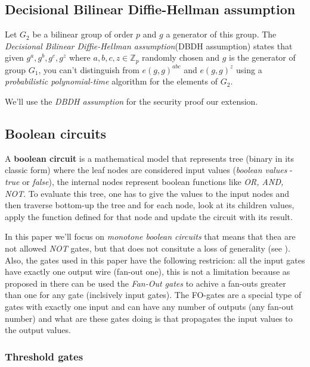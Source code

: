 \documentclass[12pt]{article}
\begin{document}
\subsection{Decisional Bilinear Diffie-Hellman assumption}

Let $G_2$ be a bilinear group of order $p$ and $g$ a generator of this group. The \textit{Decisional Bilinear Diffie-Hellman assumption}(DBDH assumption) states that given $g^a, g^b, g^c, g^z$ where $a, b, c, z \in \mathbb{Z}_p$ randomly chosen and $g$ is the generator of group $G_1$, you can't distinguish from $e(g, g)^{abc}$ and $e(g, g)^z$ using a \textit{probabilistic polynomial-time} algorithm for the elements of $G_2$.

We'll use the \textit{DBDH assumption} for the security proof our extension.

\subsection{Boolean circuits}

A \textbf{boolean circuit} is a mathematical model that represents tree (binary in its classic form) where the leaf nodes are considered input values (\textit{boolean values} - \textit{true} or \textit{false}), the internal nodes represent boolean functions like \textit{OR, AND, NOT}. To evaluate this tree, one has to give the values to the input nodes and then traverse bottom-up the tree and for each node, look at its children values, apply the function defined for that node and update the circuit with its result. 

In this paper we'll focus on \textit{monotone boolean circuits} that means that thea are not allowed \textit{NOT} gates, but that does not consitute a loss of generality (see \cite{gghsw}). Also, the gates used in this paper have the following restricion: all the input gates have exactly one output wire (fan-out one), this is not a limitation because as proposed in \cite{fltccd} there can be used the \textit{Fan-Out gates} to achive a fan-outs greater than one for any gate (inclsively input gates). The FO-gates are a special type of gates with exactly one input and can have any number of outputs (any fan-out number) and what are these gates doing is that propagates the input values to the output values.

\subsubsection{Threshold gates}
\end{document}
